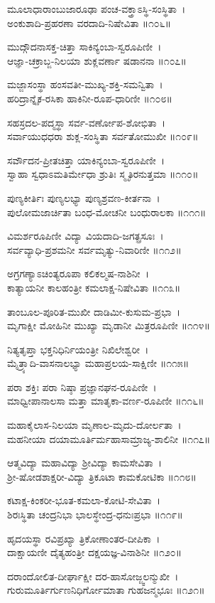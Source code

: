 ಮೂಲಾಧಾರಾಂಬುಜಾರೂಢಾ ಪಂಚ-ವಕ್ತ್ರಾಽಸ್ಥಿ-ಸಂಸ್ಥಿತಾ~।\\
ಅಂಕುಶಾದಿ-ಪ್ರಹರಣಾ ವರದಾದಿ-ನಿಷೇವಿತಾ ॥೧೦೬॥

ಮುದ್ಗೌದನಾಸಕ್ತ-ಚಿತ್ತಾ ಸಾಕಿನ್ಯಂಬಾ-ಸ್ವರೂಪಿಣೀ~।\\
ಆಜ್ಞಾ-ಚಕ್ರಾಬ್ಜ-ನಿಲಯಾ ಶುಕ್ಲವರ್ಣಾ ಷಡಾನನಾ ॥೧೦೭॥

ಮಜ್ಜಾಸಂಸ್ಥಾ ಹಂಸವತೀ-ಮುಖ್ಯ-ಶಕ್ತಿ-ಸಮನ್ವಿತಾ~।\\
ಹರಿದ್ರಾನ್ನೈಕ-ರಸಿಕಾ ಹಾಕಿನೀ-ರೂಪ-ಧಾರಿಣೀ ॥೧೦೮॥

ಸಹಸ್ರದಲ-ಪದ್ಮಸ್ಥಾ ಸರ್ವ-ವರ್ಣೋಪ-ಶೋಭಿತಾ~।\\
ಸರ್ವಾಯುಧಧರಾ ಶುಕ್ಲ-ಸಂಸ್ಥಿತಾ ಸರ್ವತೋಮುಖೀ ॥೧೦೯॥

ಸರ್ವೌದನ-ಪ್ರೀತಚಿತ್ತಾ ಯಾಕಿನ್ಯಂಬಾ-ಸ್ವರೂಪಿಣೀ~।\\
ಸ್ವಾಹಾ ಸ್ವಧಾಽಮತಿರ್ಮೇಧಾ ಶ್ರುತಿಃ ಸ್ಮೃತಿರನುತ್ತಮಾ ॥೧೧೦॥

ಪುಣ್ಯಕೀರ್ತಿಃ ಪುಣ್ಯಲಭ್ಯಾ ಪುಣ್ಯಶ್ರವಣ-ಕೀರ್ತನಾ~।\\
ಪುಲೋಮಜಾರ್ಚಿತಾ ಬಂಧ-ಮೋಚನೀ ಬಂಧುರಾಲಕಾ ॥೧೧೧॥

ವಿಮರ್ಶರೂಪಿಣೀ ವಿದ್ಯಾ ವಿಯದಾದಿ-ಜಗತ್ಪ್ರಸೂಃ~।\\
ಸರ್ವವ್ಯಾಧಿ-ಪ್ರಶಮನೀ ಸರ್ವಮೃತ್ಯು-ನಿವಾರಿಣೀ ॥೧೧೨॥

ಅಗ್ರಗಣ್ಯಾಽಚಿಂತ್ಯರೂಪಾ ಕಲಿಕಲ್ಮಷ-ನಾಶಿನೀ~।\\
ಕಾತ್ಯಾಯನೀ ಕಾಲಹಂತ್ರೀ ಕಮಲಾಕ್ಷ-ನಿಷೇವಿತಾ ॥೧೧೩॥

ತಾಂಬೂಲ-ಪೂರಿತ-ಮುಖೀ ದಾಡಿಮೀ-ಕುಸುಮ-ಪ್ರಭಾ~।\\
ಮೃಗಾಕ್ಷೀ ಮೋಹಿನೀ ಮುಖ್ಯಾ ಮೃಡಾನೀ ಮಿತ್ರರೂಪಿಣೀ ॥೧೧೪॥

ನಿತ್ಯತೃಪ್ತಾ ಭಕ್ತನಿಧಿರ್ನಿಯಂತ್ರೀ ನಿಖಿಲೇಶ್ವರೀ~।\\
ಮೈತ್ರ್ಯಾದಿ-ವಾಸನಾಲಭ್ಯಾ ಮಹಾಪ್ರಲಯ-ಸಾಕ್ಷಿಣೀ ॥೧೧೫॥

ಪರಾ ಶಕ್ತಿಃ ಪರಾ ನಿಷ್ಠಾ ಪ್ರಜ್ಞಾನಘನ-ರೂಪಿಣೀ~।\\
ಮಾಧ್ವೀಪಾನಾಲಸಾ ಮತ್ತಾ ಮಾತೃಕಾ-ವರ್ಣ-ರೂಪಿಣೀ ॥೧೧೬॥

ಮಹಾಕೈಲಾಸ-ನಿಲಯಾ ಮೃಣಾಲ-ಮೃದು-ದೋರ್ಲತಾ~।\\
ಮಹನೀಯಾ ದಯಾಮೂರ್ತಿರ್ಮಹಾಸಾಮ್ರಾಜ್ಯ-ಶಾಲಿನೀ ॥೧೧೭॥

ಆತ್ಮವಿದ್ಯಾ ಮಹಾವಿದ್ಯಾ ಶ್ರೀವಿದ್ಯಾ ಕಾಮಸೇವಿತಾ~।\\
ಶ್ರೀ-ಷೋಡಶಾಕ್ಷರೀ-ವಿದ್ಯಾ ತ್ರಿಕೂಟಾ ಕಾಮಕೋಟಿಕಾ ॥೧೧೮॥

ಕಟಾಕ್ಷ-ಕಿಂಕರೀ-ಭೂತ-ಕಮಲಾ-ಕೋಟಿ-ಸೇವಿತಾ~।\\
ಶಿರಃಸ್ಥಿತಾ ಚಂದ್ರನಿಭಾ ಭಾಲಸ್ಥೇಂದ್ರ-ಧನುಃಪ್ರಭಾ ॥೧೧೯॥

ಹೃದಯಸ್ಥಾ ರವಿಪ್ರಖ್ಯಾ ತ್ರಿಕೋಣಾಂತರ-ದೀಪಿಕಾ~।\\
ದಾಕ್ಷಾಯಣೀ ದೈತ್ಯಹಂತ್ರೀ ದಕ್ಷಯಜ್ಞ-ವಿನಾಶಿನೀ  ॥೧೨೦॥

ದರಾಂದೋಲಿತ-ದೀರ್ಘಾಕ್ಷೀ ದರ-ಹಾಸೋಜ್ಜ್ವಲನ್ಮುಖೀ~।\\
ಗುರುಮೂರ್ತಿರ್ಗುಣನಿಧಿರ್ಗೋಮಾತಾ ಗುಹಜನ್ಮಭೂಃ ॥೧೨೧॥


